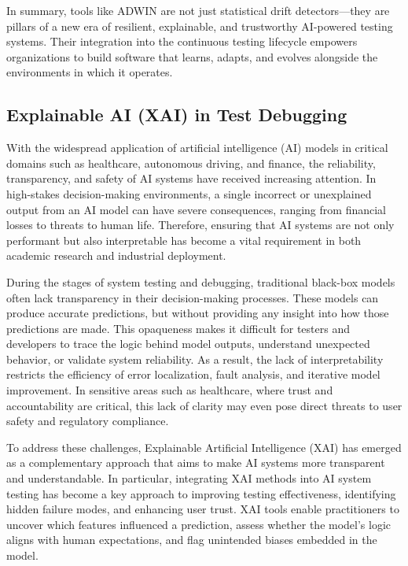 \documentclass[manuscript,screen,review]{acmart}
\begin{document}
In summary, tools like ADWIN are not just statistical drift detectors—they are pillars of a new era of resilient, explainable, and trustworthy AI-powered testing systems. Their integration into the continuous testing lifecycle empowers organizations to build software that learns, adapts, and evolves alongside the environments in which it operates.

\subsection{Explainable AI (XAI) in Test Debugging}
With the widespread application of artificial intelligence (AI) models in critical domains such as healthcare, autonomous driving, and finance, the reliability, transparency, and safety of AI systems have received increasing attention. In high-stakes decision-making environments, a single incorrect or unexplained output from an AI model can have severe consequences, ranging from financial losses to threats to human life. Therefore, ensuring that AI systems are not only performant but also interpretable has become a vital requirement in both academic research and industrial deployment.

During the stages of system testing and debugging, traditional black-box models often lack transparency in their decision-making processes. These models can produce accurate predictions, but without providing any insight into how those predictions are made. This opaqueness makes it difficult for testers and developers to trace the logic behind model outputs, understand unexpected behavior, or validate system reliability. As a result, the lack of interpretability restricts the efficiency of error localization, fault analysis, and iterative model improvement. In sensitive areas such as healthcare, where trust and accountability are critical, this lack of clarity may even pose direct threats to user safety and regulatory compliance.

To address these challenges, Explainable Artificial Intelligence (XAI) has emerged as a complementary approach that aims to make AI systems more transparent and understandable. In particular, integrating XAI methods into AI system testing has become a key approach to improving testing effectiveness, identifying hidden failure modes, and enhancing user trust. XAI tools enable practitioners to uncover which features influenced a prediction, assess whether the model’s logic aligns with human expectations, and flag unintended biases embedded in the model.
\end{document}
